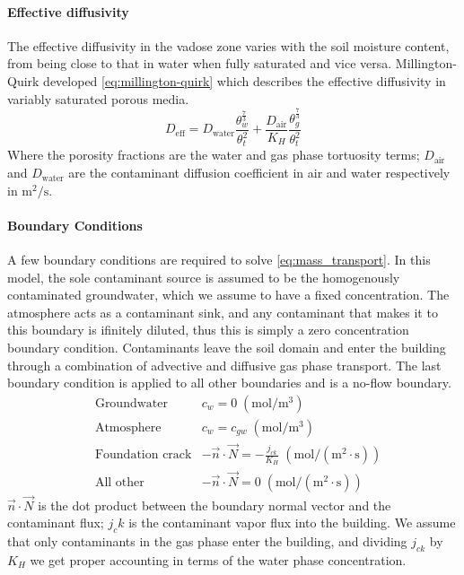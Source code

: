\paragraph{Effective diffusivity}

The effective diffusivity in the vadose zone varies with the soil moisture content, from being close to that in water when fully saturated and vice versa.
Millington-Quirk developed \eqref{eq:millington-quirk} which describes the effective diffusivity in variably saturated porous media.
\begin{equation}\label{eq:millington-quirk}
  D_\mathrm{eff} = D_\mathrm{water} \frac{\theta_w^\frac{7}{3}}{\theta_t^2} + \frac{D_\mathrm{air}}{K_H} \frac{\theta_g^\frac{7}{3}}{\theta_t^2}
\end{equation}
Where the porosity fractions are the water and gas phase tortuosity terms;
$D_\mathrm{air}$ and $D_\mathrm{water}$ are the contaminant diffusion coefficient in air and water respectively in $\mathrm{m^2/s}$.\par

\paragraph{Boundary Conditions}

A few boundary conditions are required to solve \eqref{eq:mass_transport}.
In this model, the sole contaminant source is assumed to be the homogenously contaminated groundwater, which we assume to have a fixed concentration.
The atmosphere acts as a contaminant sink, and any contaminant that makes it to this boundary is ifinitely diluted, thus this is simply a zero concentration boundary condition.
Contaminants leave the soil domain and enter the building through a combination of advective and diffusive gas phase transport.
The last boundary condition is applied to all other boundaries and is a no-flow boundary.
\begin{align}
  &\text{Groundwater} & c_w = 0 \; \mathrm{(mol/m^3)} \\
  &\text{Atmosphere} & c_w = c_{gw} \; \mathrm{(mol/m^3)} \\
  &\text{Foundation crack} & -\vec{n} \cdot \vec{N} = - \frac{j_{ck}}{K_H} \; \mathrm{(mol/(m^2 \cdot s))}\\
  &\text{All other} & -\vec{n} \cdot \vec{N} = 0 \; \mathrm{(mol/(m^2 \cdot s))}
\end{align}
$\vec{n} \cdot \vec{N}$ is the dot product between the boundary normal vector and the contaminant flux;
$j_ck$ is the contaminant vapor flux into the building.
We assume that only contaminants in the gas phase enter the building, and dividing $j_{ck}$ by $K_H$ we get proper accounting in terms of the water phase concentration.\par

